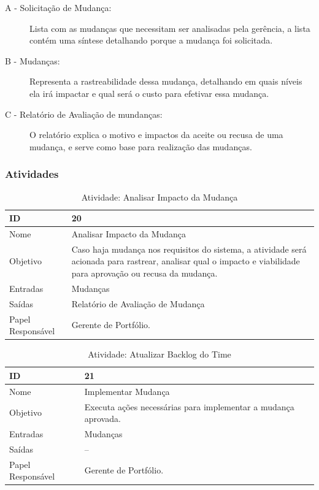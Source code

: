\begin{description}
  \item[A - Solicitação de Mudança: ]
  Lista com as mudanças que necessitam ser analisadas pela gerência, a lista contém
  uma síntese detalhando porque a mudança foi solicitada.
  \item [B - Mudanças: ] Representa a rastreabilidade dessa mudança, detalhando em
  quais níveis ela irá impactar e qual será o custo para efetivar essa mudança.
  \item [C - Relatório de Avaliação de mundanças: ] O relatório explica o motivo e impactos da aceite
  ou recusa de uma mudança, e serve como base para realização das mudanças.
\end{description}

\subsubsection{Atividades}

\begin{table}[H]
  \centering
    \begin{tabular}{| m{5em} | m{10cm} |}
      \hline
      ID       & 20   \\ \hline
      Nome     & Analisar Impacto da Mudança \\ \hline
      Objetivo & Caso haja mudança nos requisitos do sistema, a atividade será acionada para rastrear, analisar qual o impacto e viabilidade para aprovação ou recusa da mudança.  \\ \hline
      Entradas & Mudanças \\ \hline
      Saídas   & Relatório de Avaliação de Mudança \\ \hline
      Papel Responsável   & Gerente de Portfólio. \\ \hline
    \end{tabular}
    \caption{Atividade: Analisar Impacto da Mudança}
    \label{tabela:atividade20}
\end{table}

\begin{table}[H]
  \centering
    \begin{tabular}{| m{5em} | m{10cm} |}
      \hline
      ID       & 21   \\ \hline
      Nome     & Implementar Mudança \\ \hline
      Objetivo & Executa ações necessárias para implementar a mudança aprovada.  \\ \hline
      Entradas & Mudanças \\ \hline
      Saídas   & -- \\ \hline
      Papel Responsável   & Gerente de Portfólio. \\ \hline
    \end{tabular}
    \caption{Atividade: Atualizar Backlog do Time}
    \label{tabela:atividade21}
\end{table}

